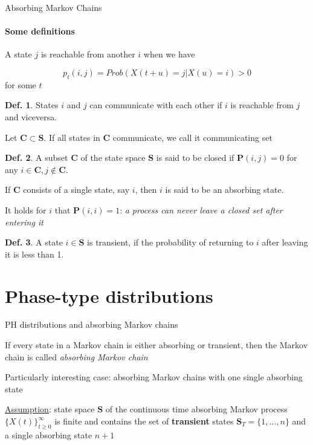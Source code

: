 \documentclass[envcountset]{beamer}
\theoremstyle{definition}
\newtheorem{mydef}{Def.}[theorem]
\begin{document}
\begin{frame}{Absorbing Markov Chains}
	\framesubtitle{Some definitions}

A state $j$ is reachable from another $i$ when we have 

$$p_t(i,j) = Prob(X(t+u) = j | X(u) = i) > 0$$
for some $t$

\begin{mydef} 
States $i$ and $j$ can communicate with each other if $i$ is reachable from $j$ and viceversa.
\end{mydef}
\vspace{5pt}
Let $\mathbf{C} \subset \mathbf{S}$. If all states in $\mathbf{C}$ communicate, we call it communicating set 

\begin{mydef}
A subset $\mathbf{C}$ of the state space $\mathbf{S}$ is said to be closed if $\mathbf{P}(i,j) = 0$ for any $i \in \mathbf{C}, j \not\in \mathbf{C}$.
\end{mydef}

\end{frame}

\begin{frame}
\hspace{5pt} If $\mathbf{C}$ consists of a single state, say $i$, then $i$ is said to be an absorbing state. 
\begin{framed}
It holds for $i$ that $\mathbf{P}(i,i) = 1$: \textit{a process can never leave a closed set after entering it}
\end{framed}
\begin{mydef}
A state $i \in \mathbf{S}$ is transient, if the probability of returning to $i$ after leaving it is less than 1.
\end{mydef}

\end{frame}

\section{Phase-type distributions}

\begin{frame}{PH distributions and absorbing Markov chains}

If every state in a Markov chain is either absorbing or transient, then the Markov chain is called \textit{absorbing Markov chain}

\begin{framed}
	Particularly interesting case: absorbing Markov chains with one single absorbing state
\end{framed}

\underline{Assumption}: state space $\mathbf{S}$ of the continuous time absorbing Markov process $\{X(t)\}_{t\geq0}^{\infty}$ is finite and contains the set of \textbf{transient} states $\mathbf{S}_T = \{1, \ldots, n\}$ and a single absorbing state $n+1$

\end{frame}
\end{document}
